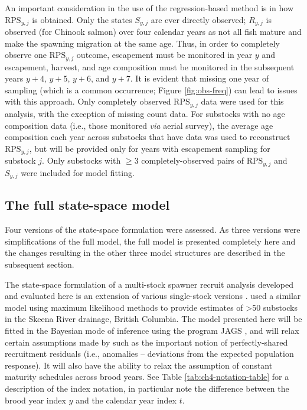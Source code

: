 \documentclass[12pt,]{book}
\theoremstyle{definition}
\theoremstyle{definition}
\theoremstyle{definition}
\theoremstyle{remark}
\begin{document}
\noindent
An important consideration in the use of the regression-based method is
in how \(\text{RPS}_{y,j}\) is obtained. Only the states \(S_{y,j}\) are
ever directly observed; \(R_{y,j}\) is observed (for Chinook salmon)
over four calendar years as not all fish mature and make the spawning
migration at the same age. Thus, in order to completely observe one
\(\text{RPS}_{y,j}\) outcome, escapement must be monitored in year \(y\)
and escapement, harvest, and age composition must be monitored in the
subsequent years \(y+4\), \(y+5\), \(y+6\), and \(y+7\). It is evident
that missing one year of sampling (which is a common occurrence; Figure
\ref{fig:obs-freq}) can lead to issues with this approach. Only
completely observed \(\text{RPS}_{y,j}\) data were used for this
analysis, with the exception of missing count data. For substocks with
no age composition data (i.e., those monitored \emph{via} aerial
survey), the average age composition each year across substocks that
have data was used to reconstruct \(\text{RPS}_{y,j}\), but will be
provided only for years with escapement sampling for substock \(j\).
Only substocks with \(\ge3\) completely-observed pairs of
\(\text{RPS}_{y,j}\) and \(S_{y,j}\) were included for model fitting.

\subsection{The full state-space model}\label{ssm-model}

\noindent
Four versions of the state-space formulation were assessed. As three
versions were simplifications of the full model, the full model is
presented completely here and the changes resulting in the other three
model structures are described in the subsequent section.

The state-space formulation of a multi-stock spawner recruit analysis
developed and evaluated here is an extension of various single-stock
versions \citep[e.g.,][]{fleischman-etal-2013}.
\citet{walters-etal-2008} used a similar model using maximum likelihood
methods to provide estimates of \textgreater{}50 substocks in the Skeena
River drainage, British Columbia. The model presented here will be
fitted in the Bayesian mode of inference using the program JAGS
\citep{plummer-2017}, and will relax certain assumptions made by
\citet{walters-etal-2008} such as the important notion of
perfectly-shared recruitment residuals (i.e., anomalies -- deviations
from the expected population response). It will also have the ability to
relax the assumption of constant maturity schedules across brood years.
See Table \ref{tab:ch4-notation-table} for a description of the index
notation, in particular note the difference between the brood year index
\(y\) and the calendar year index \(t\).
\end{document}
